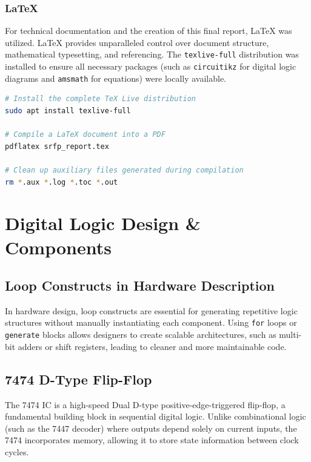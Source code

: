 \documentclass[12pt, a4paper]{report}
\begin{document}
\subsection{LaTeX}
For technical documentation and the creation of this final report, LaTeX was utilized. LaTeX provides unparalleled control over document structure, mathematical typesetting, and referencing. The \texttt{texlive-full} distribution was installed to ensure all necessary packages (such as \texttt{circuitikz} for digital logic diagrams and \texttt{amsmath} for equations) were locally available.

\begin{lstlisting}[language=bash, caption=LaTeX Compilation Workflow]
# Install the complete TeX Live distribution
sudo apt install texlive-full

# Compile a LaTeX document into a PDF
pdflatex srfp_report.tex

# Clean up auxiliary files generated during compilation
rm *.aux *.log *.toc *.out
\end{lstlisting}
\chapter{Digital Logic Design \& Components}

\section{Loop Constructs in Hardware Description}
In hardware design, loop constructs are essential for generating repetitive logic structures without manually instantiating each component. Using \texttt{for} loops or \texttt{generate} blocks allows designers to create scalable architectures, such as multi-bit adders or shift registers, leading to cleaner and more maintainable code.

\section{7474 D-Type Flip-Flop}
The 7474 IC is a high-speed Dual D-type positive-edge-triggered flip-flop, a fundamental building block in sequential digital logic. Unlike combinational logic (such as the 7447 decoder) where outputs depend solely on current inputs, the 7474 incorporates memory, allowing it to store state information between clock cycles.
\end{document}
